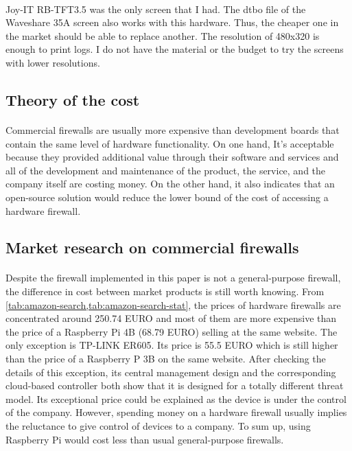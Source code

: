 \documentclass[mscthesis]{usiinfthesis}
\begin{document}
\paragraph{}
Joy-IT RB-TFT3.5 was the only screen that I had. The dtbo file of the Waveshare 35A screen also works with this hardware. Thus, the cheaper one in the market should be able to replace another. The resolution of 480x320 is enough to print logs. I do not have the material or the budget to try the screens with lower resolutions.

\subsection{Theory of the cost}
\paragraph{}
Commercial firewalls are usually more expensive than development boards that contain the same level of hardware functionality. On one hand, It's acceptable because they provided additional value through their software and services and all of the development and maintenance of the product, the service, and the company itself are costing money. On the other hand, it also indicates that an open-source solution would reduce the lower bound of the cost of accessing a hardware firewall.

\subsection{Market research on commercial firewalls}
\paragraph{}
Despite the firewall implemented in this paper is not a general-purpose firewall, the difference in cost between market products is still worth knowing. From \cref{tab:amazon-search,tab:amazon-search-stat}, the prices of hardware firewalls are concentrated around 250.74 EURO and most of them are more expensive than the price of a Raspberry Pi 4B (68.79 EURO) selling at the same website. The only exception is TP-LINK ER605. Its price is 55.5 EURO which is still higher than the price of a Raspberry P 3B on the same website. After checking the details of this exception, its central management design and the corresponding cloud-based controller both show that it is designed for a totally different threat model. Its exceptional price could be explained as the device is under the control of the company. However, spending money on a hardware firewall usually implies the reluctance to give control of devices to a company. To sum up, using Raspberry Pi would cost less than usual general-purpose firewalls.
\end{document}
